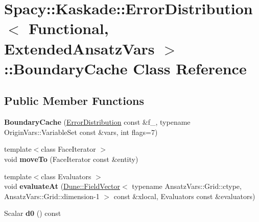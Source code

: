\hypertarget{classSpacy_1_1Kaskade_1_1ErrorDistribution_1_1BoundaryCache}{}\section{Spacy\+:\+:Kaskade\+:\+:Error\+Distribution$<$ Functional, Extended\+Ansatz\+Vars $>$\+:\+:Boundary\+Cache Class Reference}
\label{classSpacy_1_1Kaskade_1_1ErrorDistribution_1_1BoundaryCache}
\subsection*{Public Member Functions}
\begin{DoxyCompactItemize}
\item 
\hypertarget{classSpacy_1_1Kaskade_1_1ErrorDistribution_1_1BoundaryCache_a65ea7e283dec145fc027d9de95547f81}{}{\bfseries Boundary\+Cache} (\hyperlink{classSpacy_1_1Kaskade_1_1ErrorDistribution}{Error\+Distribution} const \&f\+\_\+, typename Origin\+Vars\+::\+Variable\+Set const \&vars, int flags=7)\label{classSpacy_1_1Kaskade_1_1ErrorDistribution_1_1BoundaryCache_a65ea7e283dec145fc027d9de95547f81}

\item 
\hypertarget{classSpacy_1_1Kaskade_1_1ErrorDistribution_1_1BoundaryCache_a4141971d8c30068278c92d0a06a93c92}{}{\footnotesize template$<$class Face\+Iterator $>$ }\\void {\bfseries move\+To} (Face\+Iterator const \&entity)\label{classSpacy_1_1Kaskade_1_1ErrorDistribution_1_1BoundaryCache_a4141971d8c30068278c92d0a06a93c92}

\item 
\hypertarget{classSpacy_1_1Kaskade_1_1ErrorDistribution_1_1BoundaryCache_a8719a2cba30d990dec317b9b9964137a}{}{\footnotesize template$<$class Evaluators $>$ }\\void {\bfseries evaluate\+At} (\hyperlink{classDune_1_1FieldVector}{Dune\+::\+Field\+Vector}$<$ typename Ansatz\+Vars\+::\+Grid\+::ctype, Ansatz\+Vars\+::\+Grid\+::dimension-\/1 $>$ const \&xlocal, Evaluators const \&evaluators)\label{classSpacy_1_1Kaskade_1_1ErrorDistribution_1_1BoundaryCache_a8719a2cba30d990dec317b9b9964137a}

\item 
\hypertarget{classSpacy_1_1Kaskade_1_1ErrorDistribution_1_1BoundaryCache_ac64d7cfa6822111e7abbcd296c74c93a}{}Scalar {\bfseries d0} () const \label{classSpacy_1_1Kaskade_1_1ErrorDistribution_1_1BoundaryCache_ac64d7cfa6822111e7abbcd296c74c93a}


\end{DoxyCompactItemize}

